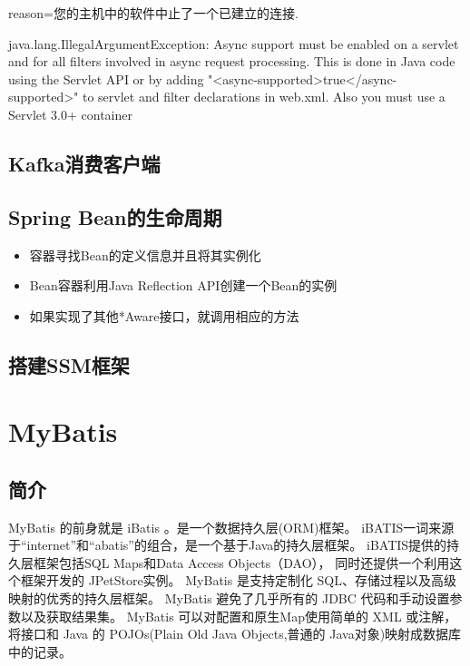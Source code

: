 \documentclass{book}
\begin{document}
reason=您的主机中的软件中止了一个已建立的连接.

java.lang.IllegalArgumentException: Async support must be enabled on a servlet 
and for all filters involved in async request processing. 
This is done in Java code using the Servlet API 
or by adding "<async-supported>true</async-supported>" to 
servlet and filter declarations in web.xml. Also you must use a Servlet 3.0+ container


\subsection{Kafka消费客户端}



\subsection{Spring Bean的生命周期}

\begin{itemize}
	\item{容器寻找Bean的定义信息并且将其实例化}
	\item{Bean容器利用Java Reflection API创建一个Bean的实例}
	\item{如果实现了其他*Aware接口，就调用相应的方法}
\end{itemize}

\subsection{搭建SSM框架}



\section{MyBatis}

\subsection{简介}

MyBatis 的前身就是 iBatis 。是一个数据持久层(ORM)框架。
iBATIS一词来源于“internet”和“abatis”的组合，是一个基于Java的持久层框架。
iBATIS提供的持久层框架包括SQL Maps和Data Access Objects（DAO），
同时还提供一个利用这个框架开发的 JPetStore实例。
MyBatis 是支持定制化 SQL、存储过程以及高级映射的优秀的持久层框架。
MyBatis 避免了几乎所有的 JDBC 代码和手动设置参数以及获取结果集。
MyBatis 可以对配置和原生Map使用简单的 XML 或注解，
将接口和 Java 的 POJOs(Plain Old Java Objects,普通的 Java对象)映射成数据库中的记录。
\end{document}

